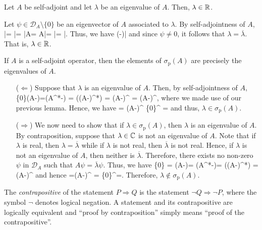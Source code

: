 \bl
Let $A$ be self-adjoint and let $\lambda$ be an eigenvalue of $A$. Then, $\lambda\in\mathbb{R}$.
\el

\bq
Let $\psi\in\mathcal{D}_A\setminus\{0\}$ be an eigenvector of $A$ associated to $\lambda$. By self-adjointness of $A$,
\bse
\lambda \langle \psi|\psi\rangle  =   \langle \psi|\lambda\psi\rangle = \langle \psi|A\psi\rangle = \langle A\psi|\psi\rangle =  \langle\lambda \psi|\psi\rangle= \overline{\lambda} \langle \psi|\psi\rangle.
\ese
Thus, we have
\bse
(\lambda-\overline{\lambda})\langle \psi|\psi{} 
\ese
and since $\psi\neq 0$, it follows that $\lambda=\overline{\lambda}$. That is, $\lambda\in\mathbb{R}$. 
\eq

\bt
If $A$ is a self-adjoint operator, then the elements of $\sigma_{\mathrm{p}}(A)$ are precisely the eigenvalues of $A$.
\et

\bq
\begin{itemize}
\item[($\Leftarrow$)] Suppose that $\lambda$ is an eigenvalue of $A$. Then, by self-adjointness of $A$,
\bse
\{0\}\neq \ker(A-\lambda)=\ker(A^*-\lambda) = \ker((A-\overline{\lambda})^*) = \ran(A-\overline{\lambda})^{\perp} = \ran(A-\lambda)^{\perp},
\ese
where we made use of our previous lemma. Hence, we have
\bse
{} =  \ran(A-\lambda)^{\perp\perp} \neq \{0\}^{\perp} = 
\ese
and thus, $\lambda\in\sigma_{\mathrm{p}}(A)$.

\item[($\Rightarrow$)] We now need to show that if $\lambda\in\sigma_{\mathrm{p}}(A)$, then $\lambda$ is an eigenvalue of $A$. By contraposition, suppose that $\lambda\in\mathbb{C}$ is not an eigenvalue of $A$. Note that if $\lambda$ is real, then $\lambda = \overline{\lambda}$ while if $\lambda$ is not real, then $\overline{\lambda}$ is not real. Hence, if $\lambda$ is not an eigenvalue of $A$, then neither is $\overline{\lambda}$. Therefore, there exists no non-zero $\psi$ in $\mathcal{D}_A$ such that $A\psi=\overline{\lambda}\psi$. Thus, we have
\bse
\{0\} = \ker(A-\overline{\lambda})= \ker(A^*-\overline{\lambda})= \ker((A-\lambda)^*) = \ran(A-\lambda)^{\perp}
\ese
and hence
\bse
{}=\ran(A-\lambda)^{\perp\perp} = \{0\}^{\perp}=.
\ese
Therefore, $\lambda\notin\sigma_{\mathrm{p}}(A)$.\qedhere
\end{itemize}
\eq

\br
The \emph{contrapositive} of the statement $P\Rightarrow Q$ is the statement $\neg Q\Rightarrow \neg P$, where the symbol $\neg$ denotes logical negation. A statement and its contrapositive are logically equivalent and ``proof by contraposition'' simply means ``proof of the contrapositive''.
\er

